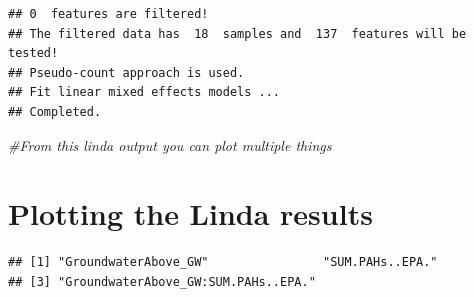 \documentclass[
]{article}
\newenvironment{Shaded}{\begin{snugshade}}{\end{snugshade}}
\newcommand{\CommentTok}[1]{\textcolor[rgb]{0.56,0.35,0.01}{\textit{#1}}}
\newcommand{\DocumentationTok}[1]{\textcolor[rgb]{0.56,0.35,0.01}{\textbf{\textit{#1}}}}
\newcommand{\FunctionTok}[1]{\textcolor[rgb]{0.13,0.29,0.53}{\textbf{#1}}}
\newcommand{\NormalTok}[1]{#1}
\newcommand{\SpecialCharTok}[1]{\textcolor[rgb]{0.81,0.36,0.00}{\textbf{#1}}}
\begin{document}
\begin{verbatim}
## 0  features are filtered!
## The filtered data has  18  samples and  137  features will be tested!
## Pseudo-count approach is used.
## Fit linear mixed effects models ...
## Completed.
\end{verbatim}

\begin{Shaded}
\begin{Highlighting}[]
\CommentTok{\#From this linda output you can plot multiple things}
\end{Highlighting}
\end{Shaded}

\section{Plotting the Linda results}\label{plotting-the-linda-results}

\begin{Shaded}
\end{Shaded}

\begin{verbatim}
## [1] "GroundwaterAbove_GW"                "SUM.PAHs..EPA."                    
## [3] "GroundwaterAbove_GW:SUM.PAHs..EPA."
\end{verbatim}
\end{document}
